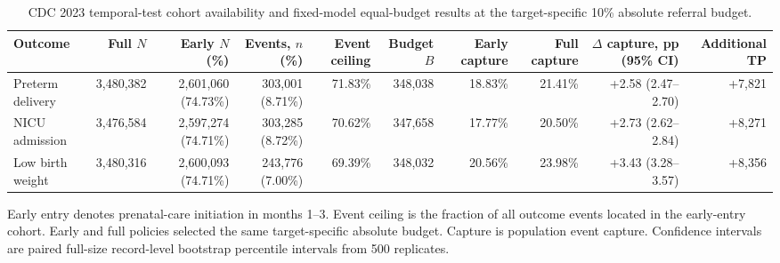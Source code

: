 \begin{table}[t]
\centering
\small
\caption{CDC 2023 temporal-test cohort availability and fixed-model equal-budget results at the target-specific 10\% absolute referral budget.}
\label{tab:main_results}
\begin{tabular}{lrrrrrrrrr}
\toprule
Outcome & Full $N$ & Early $N$ (\%) & Events, $n$ (\%) & Event ceiling & Budget $B$ & Early capture & Full capture & $\Delta$ capture, pp (95\% CI) & Additional TP \\
\midrule
Preterm delivery & 3,480,382 & 2,601,060 (74.73\%) & 303,001 (8.71\%) & 71.83\% & 348,038 & 18.83\% & 21.41\% & +2.58 (2.47–2.70) & +7,821 \\
NICU admission & 3,476,584 & 2,597,274 (74.71\%) & 303,285 (8.72\%) & 70.62\% & 347,658 & 17.77\% & 20.50\% & +2.73 (2.62–2.84) & +8,271 \\
Low birth weight & 3,480,316 & 2,600,093 (74.71\%) & 243,776 (7.00\%) & 69.39\% & 348,032 & 20.56\% & 23.98\% & +3.43 (3.28–3.57) & +8,356 \\
\bottomrule
\end{tabular}
\vspace{2pt}
\begin{minipage}{0.99\textwidth}
\footnotesize
Early entry denotes prenatal-care initiation in months 1--3. Event ceiling is the fraction of all outcome events located in the early-entry cohort. Early and full policies selected the same target-specific absolute budget. Capture is population event capture. Confidence intervals are paired full-size record-level bootstrap percentile intervals from 500 replicates.
\end{minipage}
\end{table}
